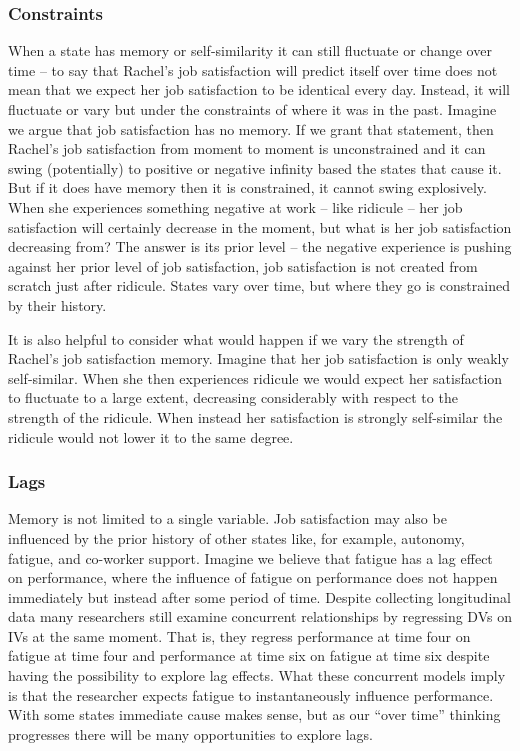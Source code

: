 \documentclass[english,,man]{apa6}
\theoremstyle{definition}
\theoremstyle{definition}
\theoremstyle{definition}
\theoremstyle{remark}
\begin{document}
\hypertarget{constraints}{%
\subsubsection{Constraints}\label{constraints}}

When a state has memory or self-similarity it can still fluctuate or
change over time -- to say that Rachel's job satisfaction will predict
itself over time does not mean that we expect her job satisfaction to be
identical every day. Instead, it will fluctuate or vary but under the
constraints of where it was in the past. Imagine we argue that job
satisfaction has no memory. If we grant that statement, then Rachel's
job satisfaction from moment to moment is unconstrained and it can swing
(potentially) to positive or negative infinity based the states that
cause it. But if it does have memory then it is constrained, it cannot
swing explosively. When she experiences something negative at work --
like ridicule -- her job satisfaction will certainly decrease in the
moment, but what is her job satisfaction decreasing from? The answer is
its prior level -- the negative experience is pushing against her prior
level of job satisfaction, job satisfaction is not created from scratch
just after ridicule. States vary over time, but where they go is
constrained by their history.

It is also helpful to consider what would happen if we vary the strength
of Rachel's job satisfaction memory. Imagine that her job satisfaction
is only weakly self-similar. When she then experiences ridicule we would
expect her satisfaction to fluctuate to a large extent, decreasing
considerably with respect to the strength of the ridicule. When instead
her satisfaction is strongly self-similar the ridicule would not lower
it to the same degree.

\hypertarget{lags}{%
\subsubsection{Lags}\label{lags}}

Memory is not limited to a single variable. Job satisfaction may also be
influenced by the prior history of other states like, for example,
autonomy, fatigue, and co-worker support. Imagine we believe that
fatigue has a lag effect on performance, where the influence of fatigue
on performance does not happen immediately but instead after some period
of time. Despite collecting longitudinal data many researchers still
examine concurrent relationships by regressing DVs on IVs at the same
moment. That is, they regress performance at time four on fatigue at
time four and performance at time six on fatigue at time six despite
having the possibility to explore lag effects. What these concurrent
models imply is that the researcher expects fatigue to instantaneously
influence performance. With some states immediate cause makes sense, but
as our \enquote{over time} thinking progresses there will be many
opportunities to explore lags.
\end{document}
